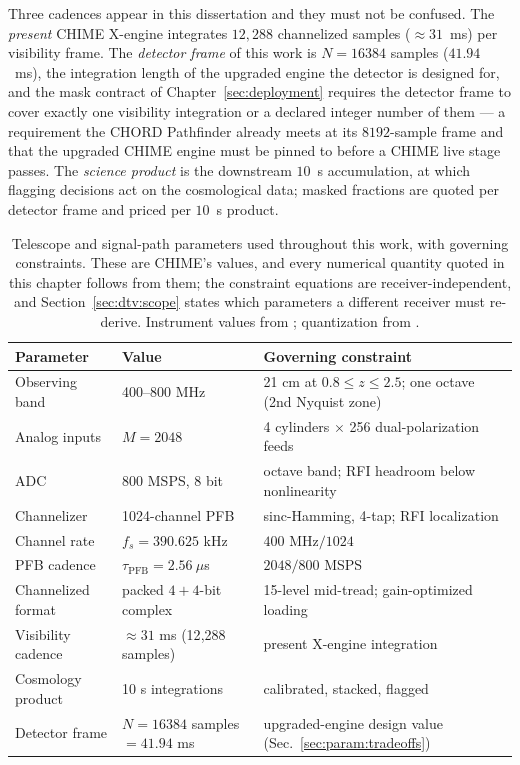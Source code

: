 Three cadences appear in this dissertation and they must not be confused. The \emph{present} CHIME X-engine integrates $12{,}288$ channelized samples ($\approx 31$~ms) per visibility frame. The \emph{detector frame} of this work is $N = 16384$ samples ($41.94$~ms), the integration length of the upgraded engine the detector is designed for, and the mask contract of Chapter~\ref{sec:deployment} requires the detector frame to cover exactly one visibility integration or a declared integer number of them --- a requirement the CHORD Pathfinder already meets at its $8192$-sample frame and that the upgraded CHIME engine must be pinned to before a CHIME live stage passes. The \emph{science product} is the downstream $10$~s accumulation, at which flagging decisions act on the cosmological data; masked fractions are quoted per detector frame and priced per $10$~s product.

\begin{table}[H]
\centering
\footnotesize
\caption[Telescope and signal-path parameters]{Telescope and signal-path parameters used throughout this work, with governing constraints. These are CHIME's values, and every numerical quantity quoted in this chapter follows from them; the constraint equations are receiver-independent, and Section~\ref{sec:dtv:scope} states which parameters a different receiver must re-derive. Instrument values from \cite{amiri2022chime}; quantization from \cite{amiri2022chime,menaparra2018}.}
\label{tab:telescope}
\begin{tabular}{lll}
\toprule
Parameter & Value & Governing constraint \\
\midrule
Observing band & 400--800 MHz & 21 cm at $0.8 \le z \le 2.5$; one octave (2nd Nyquist zone) \\
Analog inputs & $M = 2048$ & 4 cylinders $\times$ 256 dual-polarization feeds \\
ADC & 800 MSPS, 8 bit & octave band; RFI headroom below nonlinearity \\
Channelizer & 1024-channel PFB & sinc-Hamming, 4-tap; RFI localization \\
Channel rate & $f_s = 390.625$ kHz & $400\text{ MHz}/1024$ \\
PFB cadence & $\tau_{\text{PFB}} = 2.56~\mu$s & $2048/800$ MSPS \\
Channelized format & packed $4{+}4$-bit complex & 15-level mid-tread; gain-optimized loading \\
Visibility cadence & ${\approx}31$ ms (12{,}288 samples) & present X-engine integration \\
Cosmology product & 10 s integrations & calibrated, stacked, flagged \\
Detector frame & $N = 16384$ samples $= 41.94$ ms & upgraded-engine design value (Sec.~\ref{sec:param:tradeoffs}) \\
\bottomrule
\end{tabular}
\end{table}

